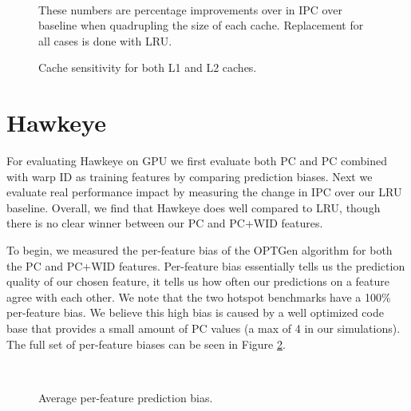 \begin{figure}[htb]
\begin{center}
\ 
\caption{Cache sensitivity for both L1 and L2 caches.} These numbers are percentage improvements over in IPC over baseline when quadrupling the size of each cache. Replacement for all cases is done with LRU.
\label{f:sensitivity}
\end{center}
\end{figure}
%

\section{Hawkeye}
For evaluating Hawkeye on GPU we first evaluate both PC and PC combined with warp ID as training features by comparing prediction biases. Next we evaluate real performance impact by measuring the change in IPC over our LRU baseline. Overall, we find that Hawkeye does well compared to LRU, though there is no clear winner between our PC and PC+WID features.

To begin, we measured the per-feature bias of the OPTGen algorithm for both the PC and PC+WID features. Per-feature bias essentially tells us the prediction quality of our chosen feature, it tells us how often our predictions on a feature agree with each other. We note that the two hotspot benchmarks have a 100\% per-feature bias. We believe this high bias is caused by a well optimized code base that provides a small amount of PC values (a max of 4 in our simulations). The full set of per-feature biases can be seen in Figure \ref{f:feature_bias}.

\begin{figure}[htb]
\begin{center}
\ 
\caption{Average per-feature prediction bias.}
\label{f:feature_bias}
\end{center}
\end{figure}

